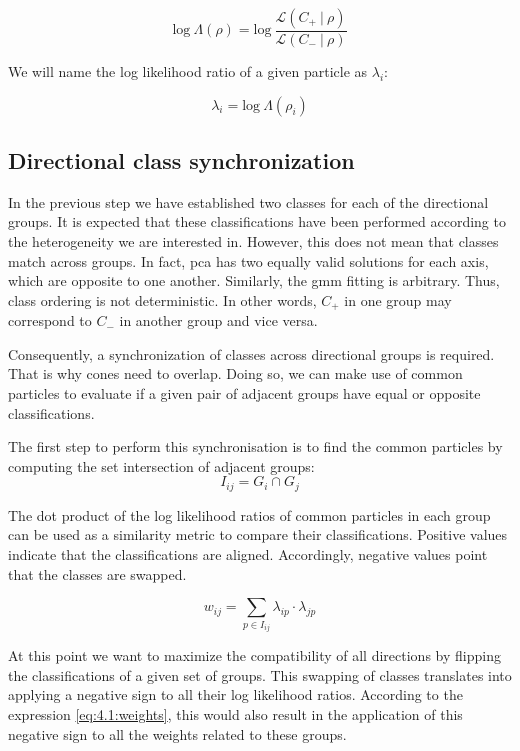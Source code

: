 \documentclass[../main.tex]{subfiles}
\begin{document}
\begin{equation}\label{fig:4.1:likelihood}
    \text{log}\ \Lambda(\rho) = \text{log}\ \frac{\mathcal{L}(C_+\ |\ \rho)}{\mathcal{L}(C_-\ |\ \rho)}
\end{equation}

We will name the log likelihood ratio of a given particle as $\lambda_i$:

\begin{equation}
    \lambda_i = \text{log}\ \Lambda(\rho_i) 
\end{equation}

\subsection{Directional class synchronization}
In the previous step we have established two classes for each of the directional groups. It is expected that these classifications have been performed according to the heterogeneity we are interested in. However, this does not mean that classes match across groups. In fact, \gls{pca} has two equally valid solutions for each axis, which are opposite to one another. Similarly, the \gls{gmm} fitting is arbitrary. Thus, class ordering is not deterministic. In other words, $C_+$ in one group may correspond to $C_-$ in another group and vice versa.

Consequently, a synchronization of classes across directional groups is required. That is why cones need to overlap. Doing so, we can make use of common particles to evaluate if a given pair of adjacent groups have equal or opposite classifications. 

The first step to perform this synchronisation is to find the common particles by computing the set intersection of adjacent groups:
\begin{equation}\label{eq:4.1:intersection}
    I_{ij} = G_i \cap G_j
\end{equation}

The dot product of the log likelihood ratios of common particles in each group can be used as a similarity metric to compare their classifications. Positive values indicate that the classifications are aligned. Accordingly, negative values point that the classes are swapped. 

\begin{equation}\label{eq:4.1:weights}
    w_{ij} = \sum_{p \in I_{ij}} \lambda_{ip} \cdot \lambda_{jp}
\end{equation}

At this point we want to maximize the compatibility of all directions by flipping the classifications of a given set of groups. This swapping of classes translates into applying a negative sign to all their log likelihood ratios. According to the expression \eqref{eq:4.1:weights}, this would also result in the application of this negative sign to all the weights related to these groups. 
\end{document}
